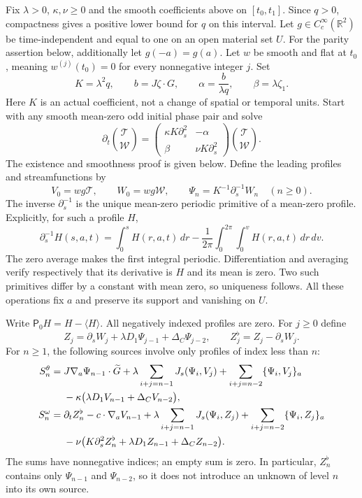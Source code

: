 Fix $\lambda>0$, $\kappa,\nu\geq0$ and the smooth coefficients above
on $[t_0,t_1]$. Since $q>0$, compactness gives a positive lower bound
for $q$ on this interval. Let $g\in C_c^\infty(\mathbb R^2)$ be
time-independent and equal to one on an open material set $U$.
For the parity assertion below, additionally let $g(-a)=g(a)$.
Let $w$ be smooth and flat at $t_0$, meaning $w^{(j)}(t_0)=0$ for
every nonnegative integer $j$.
Set
\[
K=\lambda^2q,\qquad b=J\zeta\cdot G,\qquad
\alpha=\frac{b}{\lambda q},\qquad \beta=\lambda\zeta_1.
\]
Here $K$ is an actual coefficient, not a change of spatial or temporal
units. Start with any smooth mean-zero odd initial phase pair and solve
\begin{equation}
\partial_t\binom{\mathcal T}{\mathcal W}
=\begin{pmatrix}\kappa K\partial_s^2&-\alpha\\
                   \beta&\nu K\partial_s^2\end{pmatrix}
  \binom{\mathcal T}{\mathcal W}.
\label{eq:ll-phase-evolution}
\end{equation}
The existence and smoothness proof is given below. Define the leading
profiles and streamfunctions by
\begin{equation}
V_0=wg\mathcal T,\qquad W_0=wg\mathcal W,
\qquad
\Psi_n=K^{-1}\partial_s^{-1}W_n\quad(n\geq0).
\label{eq:ll-level-def}
\end{equation}
The inverse $\partial_s^{-1}$ is the unique mean-zero periodic
primitive of a mean-zero profile. Explicitly, for such a profile $H$,
\[
\partial_s^{-1}H(s,a,t)
=\int_0^sH(r,a,t)\,dr
 -\frac1{2\pi}\int_0^{2\pi}\int_0^vH(r,a,t)\,dr\,dv.
\]
The zero average makes the first integral periodic. Differentiation
and averaging verify respectively that its derivative is $H$ and its
mean is zero. Two such primitives differ by a constant with mean zero,
so uniqueness follows. All these operations fix $a$ and preserve its
support and vanishing on $U$.

Write $\mathsf P_0H=H-\langle H\rangle$. All negatively indexed
profiles are zero. For $j\geq0$ define
\begin{equation}
Z_j=\partial_sW_j+\lambda D_1\Psi_{j-1}+\Delta_C\Psi_{j-2},
\qquad Z_j^\flat=Z_j-\partial_sW_j.
\label{eq:ll-z-def}
\end{equation}
For $n\geq1$, the following sources involve only profiles of index
less than $n$:
\begin{align}
S_n^\theta={}&J\nabla_a\Psi_{n-1}\cdot\widetilde G
 +\lambda\sum_{i+j=n-1}J_s(\Psi_i,V_j)
 +\sum_{i+j=n-2}\{\Psi_i,V_j\}_a
\notag\\
&-\kappa\bigl(\lambda D_1V_{n-1}+\Delta_CV_{n-2}\bigr),
\label{eq:ll-source-theta}\\
S_n^\omega={}&\partial_tZ_n^\flat-c\cdot\nabla_aV_{n-1}
 +\lambda\sum_{i+j=n-1}J_s(\Psi_i,Z_j)
 +\sum_{i+j=n-2}\{\Psi_i,Z_j\}_a
\notag\\
&-\nu\bigl(K\partial_s^2Z_n^\flat
       +\lambda D_1Z_{n-1}+\Delta_CZ_{n-2}\bigr).
\label{eq:ll-source-omega}
\end{align}
The sums have nonnegative indices; an empty sum is zero. In particular,
$Z_n^\flat$ contains only $\Psi_{n-1}$ and $\Psi_{n-2}$, so it
does not introduce an unknown of level $n$ into its own source.

